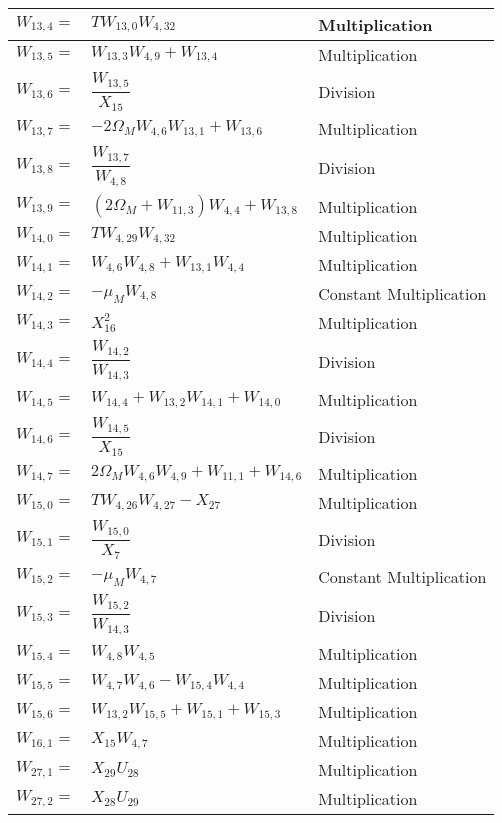\begin{longtable}{|p{1.5cm}|l|p{2cm}|}
$W_{13,4}=$ & $ T W_{13,0} W_{4,32} $ & Multiplication \\ \hline
$W_{13,5}=$ & $ W_{13,3}W_{4,9}+W_{13,4} $ & Multiplication \\ \hline
$W_{13,6}=$ & $ \dfrac{W_{13,5}}{X_{15}} $ & Division \\ \hline
$W_{13,7}=$ & $ -2\Omega_{M}W_{4,6}W_{13,1}+W_{13,6} $ & Multiplication \\ \hline
$W_{13,8}=$ & $ \dfrac{W_{13,7}}{W_{4,8}} $ & Division \\ \hline
$W_{13,9}=$ & $ \left(2\Omega_{M}+W_{11,3} \right)W_{4,4}+W_{13,8} $ & Multiplication \\ \hline
$W_{14,0}=$ & $ T W_{4,29}W_{4,32} $ & Multiplication \\ \hline
$W_{14,1}=$ & $ W_{4,6}W_{4,8}+W_{13,1}W_{4,4} $ & Multiplication \\ \hline
$W_{14,2}=$ & $ -\mu_{M}W_{4,8} $ & Constant \mbox{Multiplication} \\ \hline
$W_{14,3}=$ & $ X_{16}^{2} $ & Multiplication \\ \hline
$W_{14,4}=$ & $ \dfrac{W_{14,2}}{W_{14,3}} $ & Division \\ \hline
$W_{14,5}=$ & $ W_{14,4}+W_{13,2}W_{14,1}+W_{14,0} $ & Multiplication \\ \hline
$W_{14,6}=$ & $ \dfrac{W_{14,5}}{X_{15}} $ & Division \\ \hline
$W_{14,7}=$ & $ 2\Omega_{M}W_{4,6}W_{4,9}+W_{11,1}+W_{14,6} $ & Multiplication \\ \hline
$W_{15,0}=$ & $ TW_{4,26}W_{4,27}-X_{27} $ & Multiplication \\ \hline
$W_{15,1}=$ & $ \dfrac{W_{15,0}}{X_{7}} $ & Division \\ \hline
$W_{15,2}=$ & $ -\mu_{M}W_{4,7} $ & Constant \mbox{Multiplication} \\ \hline
$W_{15,3}=$ & $ \dfrac{W_{15,2}}{W_{14,3}} $ & Division \\ \hline
$W_{15,4}=$ & $ W_{4,8}W_{4,5} $ & Multiplication \\ \hline
$W_{15,5}=$ & $ W_{4,7}W_{4,6}-W_{15,4}W_{4,4} $ & Multiplication \\ \hline
$W_{15,6}=$ & $ W_{13,2}W_{15,5}+W_{15,1}+W_{15,3} $ & Multiplication \\ \hline
$W_{16,1}=$ & $ X_{15}W_{4,7} $ & Multiplication \\ \hline
$W_{27,1}=$ & $ X_{29}U_{28} $ & Multiplication \\ \hline
$W_{27,2}=$ & $ X_{28}U_{29} $ & Multiplication \\ \hline

\end{longtable}
